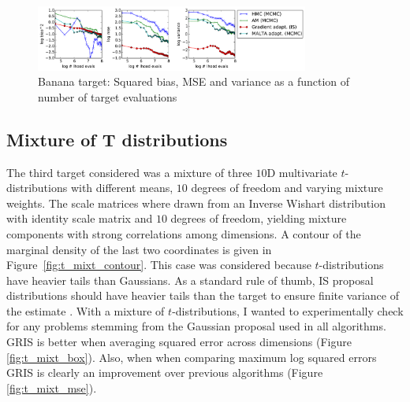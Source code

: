 \begin{figure}[tbp]
\begin{center}
\includegraphics[width=0.8\textwidth]{figures/Banana_b2_mse_var.pdf}
\caption{Banana target: Squared bias, MSE and variance as a function of number of target evaluations}
\label{fig:Banana_mse}
\end{center}
\end{figure}


\subsection{Mixture of T distributions}
The third target considered was a mixture of three $10$D multivariate $t$-distributions with different means, $10$ degrees of freedom and varying mixture weights. The scale matrices where drawn from an Inverse Wishart distribution with identity scale matrix and $10$ degrees of freedom, yielding mixture components with strong correlations among dimensions.  A contour of the marginal density of the last two coordinates is given in Figure~\ref{fig:t_mixt_contour}. This case was considered because $t$-distributions have heavier tails than Gaussians. As a standard rule of thumb, IS proposal distributions should have heavier tails than the target to ensure finite variance of the estimate \cite{Robert2004}. With a mixture of $t$-distributions, I wanted to experimentally check for any problems stemming from the Gaussian proposal used in all algorithms. GRIS is better when averaging squared error across dimensions (Figure \ref{fig:t_mixt_box}). Also, when when comparing maximum log squared errors GRIS is clearly an improvement over previous algorithms (Figure \ref{fig:t_mixt_mse}). 

